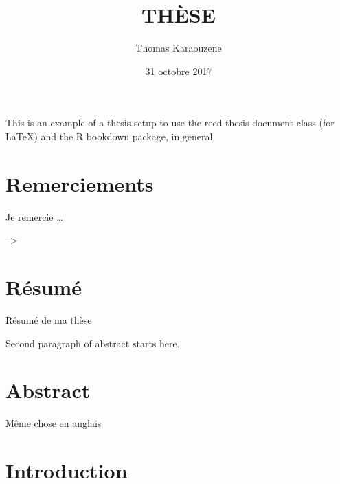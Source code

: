 \documentclass[12pt,twoside]{reedthesis}
\title{THÈSE}
\author{Thomas Karaouzene}
\date{31 octobre 2017}
\theoremstyle{definition}
\theoremstyle{definition}
\theoremstyle{remark}
\begin{document}
      \maketitle
  
  \frontmatter %
  \pagestyle{empty} %

  
      \begin{preface}
      This is an example of a thesis setup to use the reed thesis document
      class (for LaTeX) and the R bookdown package, in general.
    \end{preface}
  
      \hypersetup{linkcolor=black}
    \setcounter{tocdepth}{3}
    \tableofcontents
  
      \listoftables
  
      \listoffigures
  
  
  
  \mainmatter %
  \pagestyle{fancyplain} %

  \chapter*{Remerciements}\label{remerciements}
  
  Je remercie \ldots{}
  
   --\textgreater{}
  
  \chapter*{Résumé}\label{resume}
  
  Résumé de ma thèse \par
  Second paragraph of abstract starts here.
  
  \chapter*{Abstract}\label{abstract}
  
  Même chose en anglais
  
  \chapter{Introduction}\label{introInf}
  
\end{document}
